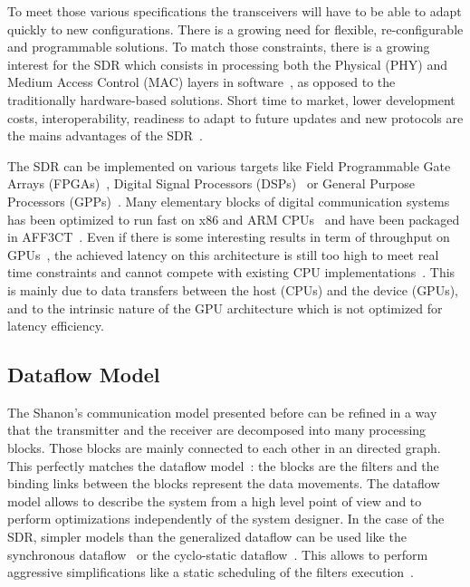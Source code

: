 To meet those various specifications the transceivers will have to be able to
adapt quickly to new configurations. There is a growing need for flexible,
re-configurable and programmable solutions. To match those constraints, there is
a growing interest for the SDR which consists in processing both the Physical
(PHY) and Medium Access Control (MAC) layers in software~\cite{Mitola1993}, as
opposed to the traditionally hardware-based solutions. Short time to market,
lower development costs, interoperability, readiness to adapt to future updates
and new protocols are the mains advantages of the SDR~\cite{Akeela2018}.

The SDR can be implemented on various targets like Field Programmable Gate
Arrays (FPGAs)~\cite{Coulton2004,Skey2006,Dutta2010,Shaik2013,Maheshwarappa2015,
Nivin2016}, Digital Signal Processors (DSPs)~\cite{Kaur2008,Karlsson2013,
Shaik2013} or General Purpose Processors (GPPs)~\cite{Yoge2012,Bang2014,
Meshram2019,Grayver2020}. Many elementary blocks of digital communication
systems has been optimized to run fast on x86 and ARM
CPUs~\cite{Cassagne2015c,Cassagne2016a,Cassagne2016b,Cassagne2018,Leonardon2019,
Ghaffari2019} and have been packaged in AFF3CT~\cite{Cassagne2017a,
Cassagne2019a}. Even if there is some interesting results in term of throughput
on GPUs~\cite{Xianjun2013,Li2014,LeGal2014a,Giard2016b,Keskin2017a}, the
achieved latency on this architecture is still too high to meet real time
constraints and cannot compete with existing CPU
implementations~\cite{LeGal2015a,Cassagne2015c,Giard2016b,Cassagne2016a,
LeGal2017,Leonardon2019,LeGal2019a}. This is mainly due to data transfers
between the host (CPUs) and the device (GPUs), and to the intrinsic nature of
the GPU architecture which is not optimized for latency efficiency.

\subsection{Dataflow Model}

The Shanon's communication model presented before can be refined in a way
that the transmitter and the receiver are decomposed into many processing
blocks. Those blocks are mainly connected to each other in an directed graph.
This perfectly matches the dataflow model~\cite{Dennis1980,Ackerman1982}: the
blocks are the filters and the binding links between the blocks represent the
data movements. The dataflow model allows to describe the system from a high
level point of view and to perform optimizations independently of the system
designer. In the case of the SDR, simpler models than the generalized dataflow
can be used like the synchronous dataflow~\cite{Lee1987} or the cyclo-static
dataflow~\cite{Engels1994,Bilsen1995}. This allows to perform aggressive
simplifications like a static scheduling of the filters
execution~\cite{Parks1995}.

